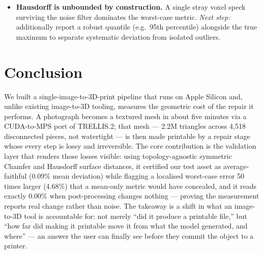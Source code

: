 \documentclass[11pt,a4paper]{article}
\begin{document}
\begin{itemize}[leftmargin=*]
        confirming that the diagnostics predict real print outcomes.
        \emph{Next step:} print a sample spanning the range of reported
        overhang and thin-wall scores and correlate the predictions with
        observed failures --- the only way to establish that the thresholds
        are calibrated rather than plausible.
  \item \textbf{Hausdorff is unbounded by construction.} A single stray voxel
        speck surviving the noise filter dominates the worst-case metric.
        \emph{Next step:} additionally report a robust quantile (e.g.\ 95th
        percentile) alongside the true maximum to separate systematic
        deviation from isolated outliers.
\end{itemize}

\section{Conclusion}

We built a single-image-to-3D-print pipeline that runs on Apple Silicon and,
unlike existing image-to-3D tooling, measures the geometric cost of the repair
it performs. A photograph becomes a textured mesh in about five minutes via a
CUDA-to-MPS port of TRELLIS.2; that mesh --- 2.2M triangles across 4{,}518
disconnected pieces, not watertight --- is then made printable by a repair stage
whose every step is lossy and irreversible. The core contribution is the
validation layer that renders those losses visible: using topology-agnostic
symmetric Chamfer and Hausdorff surface distances, it certified our test asset
as average-faithful (0.09\% mean deviation) while flagging a localised worst-case
error 50 times larger (4.68\%) that a mean-only metric would have concealed, and
it reads exactly 0.00\% when post-processing changes nothing --- proving the
measurement reports real change rather than noise. The takeaway is a shift in
what an image-to-3D tool is accountable for: not merely ``did it produce a
printable file,'' but ``how far did making it printable move it from what the
model generated, and where'' --- an answer the user can finally see before they
commit the object to a printer.

\printbibliography
\end{document}
